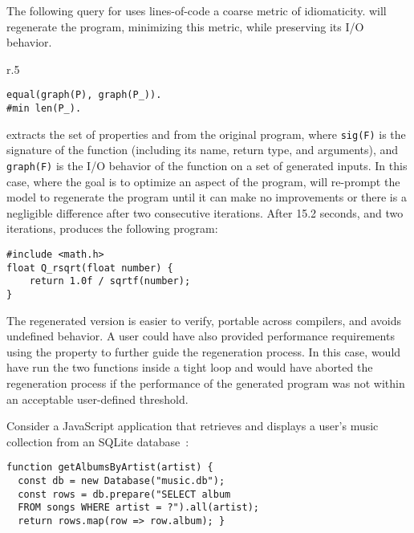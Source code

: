 \documentclass[a4paper,twoside,12pt]{report} %
\begin{document}
The following query for \sys uses lines-of-code a coarse metric of
idiomaticity. \sys will regenerate the program, minimizing this metric, while
preserving its I/O behavior.
\begin{wrapfigure}[3]{r}{.5\columnwidth}
  \vspace{-5pt}
  \begin{verbatim}
equal(graph(P), graph(P_)).
#min len(P_).
  \end{verbatim}
\end{wrapfigure}
\sys extracts the set of properties  and  from the original program, where \texttt{sig(F)} is the
signature of the function (including its name, return type, and arguments), and \texttt{graph(F)} is the I/O behavior of the function
on a set of generated inputs.
In this case, where the goal is to optimize an aspect of the program, \sys will re-prompt
the model to regenerate the program until it can make no improvements or there is a negligible difference after two consecutive iterations.
After 15.2 seconds, and two iterations, \sys produces the following program:
\begin{verbatim}
#include <math.h>
float Q_rsqrt(float number) {
    return 1.0f / sqrtf(number);
}
\end{verbatim}
The regenerated version is easier to verify, portable across compilers, and
avoids undefined behavior.
A user could have also provided performance requirements using 
the  property to further guide the regeneration process.
In this case, \sys would have run the two functions inside a tight loop and 
would have aborted the regeneration process if the performance of the generated
program was not within an acceptable user-defined threshold.

Consider a JavaScript application that retrieves and displays a user's music
collection from an SQLite database~\cite{codewithsadeemusicplayer, beets}:

\begin{verbatim}
function getAlbumsByArtist(artist) {
  const db = new Database("music.db");
  const rows = db.prepare("SELECT album
  FROM songs WHERE artist = ?").all(artist);
  return rows.map(row => row.album); }
\end{verbatim}
\end{document}
